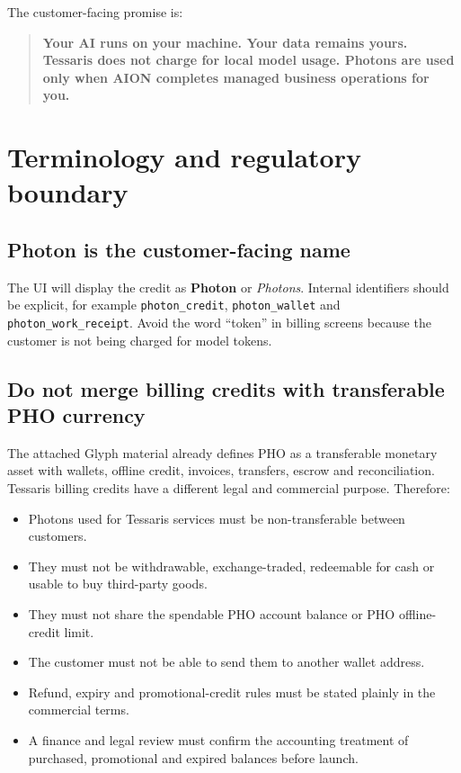 \documentclass[11pt]{article}
\newcommand{\Photon}{\textbf{Photon}}
\newcommand{\code}[1]{\texttt{#1}}
\begin{document}
The customer-facing promise is:

\begin{quote}
\textbf{Your AI runs on your machine. Your data remains yours. Tessaris does not charge for local model usage. Photons are used only when AION completes managed business operations for you.}
\end{quote}

\section{Terminology and regulatory boundary}

\subsection{Photon is the customer-facing name}

The UI will display the credit as \Photon{} or \emph{Photons}. Internal identifiers should be explicit, for example \code{photon\_credit}, \code{photon\_wallet} and \code{photon\_work\_receipt}. Avoid the word ``token'' in billing screens because the customer is not being charged for model tokens.

\subsection{Do not merge billing credits with transferable PHO currency}

The attached Glyph material already defines PHO as a transferable monetary asset with wallets, offline credit, invoices, transfers, escrow and reconciliation. Tessaris billing credits have a different legal and commercial purpose. Therefore:

\begin{itemize}
  \item Photons used for Tessaris services must be non-transferable between customers.
  \item They must not be withdrawable, exchange-traded, redeemable for cash or usable to buy third-party goods.
  \item They must not share the spendable PHO account balance or PHO offline-credit limit.
  \item The customer must not be able to send them to another wallet address.
  \item Refund, expiry and promotional-credit rules must be stated plainly in the commercial terms.
  \item A finance and legal review must confirm the accounting treatment of purchased, promotional and expired balances before launch.
\end{itemize}
\end{document}
